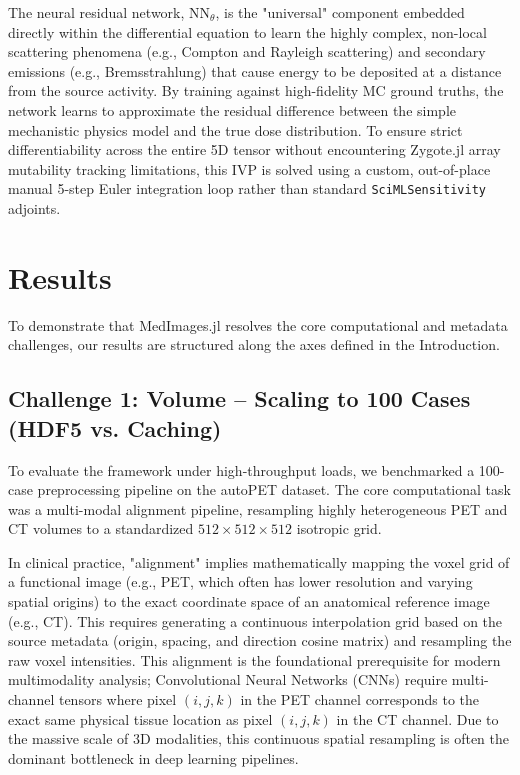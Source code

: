 \documentclass[10pt,letterpaper]{article}
\begin{document}
The neural residual network, $\text{NN}_{\theta}$, is the "universal" component embedded directly within the differential equation to learn the highly complex, non-local scattering phenomena (e.g., Compton and Rayleigh scattering) and secondary emissions (e.g., Bremsstrahlung) that cause energy to be deposited at a distance from the source activity. By training against high-fidelity MC ground truths, the network learns to approximate the residual difference between the simple mechanistic physics model and the true dose distribution. To ensure strict differentiability across the entire 5D tensor without encountering Zygote.jl array mutability tracking limitations, this IVP is solved using a custom, out-of-place manual 5-step Euler integration loop rather than standard \texttt{SciMLSensitivity} adjoints.


\section{Results}
To demonstrate that MedImages.jl resolves the core computational and metadata challenges, our results are structured along the axes defined in the Introduction.

\subsection{Challenge 1: Volume -- Scaling to 100 Cases (HDF5 vs. Caching)}
To evaluate the framework under high-throughput loads, we benchmarked a 100-case preprocessing pipeline on the autoPET dataset. The core computational task was a multi-modal alignment pipeline, resampling highly heterogeneous PET and CT volumes to a standardized $512 \times 512 \times 512$ isotropic grid.

In clinical practice, "alignment" implies mathematically mapping the voxel grid of a functional image (e.g., PET, which often has lower resolution and varying spatial origins) to the exact coordinate space of an anatomical reference image (e.g., CT). This requires generating a continuous interpolation grid based on the source metadata (origin, spacing, and direction cosine matrix) and resampling the raw voxel intensities. This alignment is the foundational prerequisite for modern multimodality analysis; Convolutional Neural Networks (CNNs) require multi-channel tensors where pixel $(i,j,k)$ in the PET channel corresponds to the exact same physical tissue location as pixel $(i,j,k)$ in the CT channel. Due to the massive scale of 3D modalities, this continuous spatial resampling is often the dominant bottleneck in deep learning pipelines.
\end{document}
